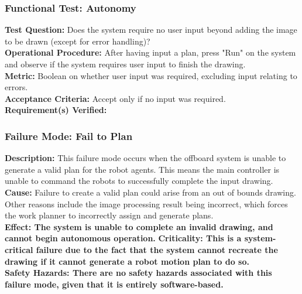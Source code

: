 \subsubsection{Functional Test: Autonomy}
\label{sec:sdp_ft_collision}
\textbf{Test Question:} Does the system require no user input beyond adding the image to be drawn (except for error handling)? \\
\textbf{Operational Procedure:}  After having input a plan, press "Run" on the system and observe if the system requires user input to finish the drawing. \\
\textbf{Metric:} Boolean on whether user input was required, excluding input relating to errors.\\
\textbf{Acceptance Criteria:} Accept only if no input was required.\\
\textbf{Requirement(s) Verified:} 


\subsubsection{Failure Mode: Fail to Plan}
\label{sec:sdp_fm_planning}
\textbf{Description:} This failure mode occurs when the offboard system is unable to generate a valid plan for the robot agents. This means the main controller is unable to command the robots to successfully complete the input drawing.\\
\textbf{Cause:} Failure to create a valid plan could arise from an out of bounds drawing. Other reasons include the image processing result being incorrect, which forces the work planner to incorrectly assign and generate plans.\\
\textbf{Effect: The system is unable to complete an invalid drawing, and cannot begin autonomous operation.}
\textbf{Criticality: This is a system-critical failure due to the fact that the system cannot recreate the drawing if it cannot generate a robot motion plan to do so.} \\
\textbf{Safety Hazards: There are no safety hazards associated with this failure mode, given that it is entirely software-based.} \\